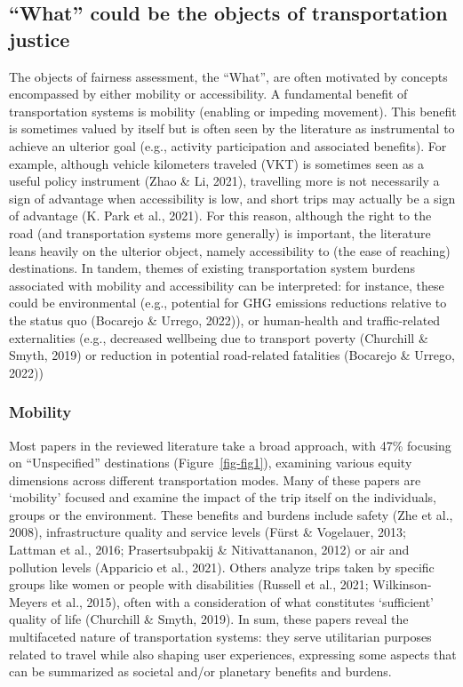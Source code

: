 \documentclass[
  letterpaper,
  DIV=11,
  numbers=noendperiod]{scrartcl}
\begin{document}
\subsection{``What'' could be the objects of transportation
justice}\label{what-could-be-the-objects-of-transportation-justice}

The objects of fairness assessment, the ``What'', are often motivated by
concepts encompassed by either mobility or accessibility. A fundamental
benefit of transportation systems is mobility (enabling or impeding
movement). This benefit is sometimes valued by itself but is often seen
by the literature as instrumental to achieve an ulterior goal (e.g.,
activity participation and associated benefits). For example, although
vehicle kilometers traveled (VKT) is sometimes seen as a useful policy
instrument (Zhao \& Li, 2021), travelling more is not necessarily a sign
of advantage when accessibility is low, and short trips may actually be
a sign of advantage (K. Park et al., 2021). For this reason, although
the right to the road (and transportation systems more generally) is
important, the literature leans heavily on the ulterior object, namely
accessibility to (the ease of reaching) destinations. In tandem, themes
of existing transportation system burdens associated with mobility and
accessibility can be interpreted: for instance, these could be
environmental (e.g., potential for GHG emissions reductions relative to
the status quo (Bocarejo \& Urrego, 2022)), or human-health and
traffic-related externalities (e.g., decreased wellbeing due to
transport poverty (Churchill \& Smyth, 2019) or reduction in potential
road-related fatalities (Bocarejo \& Urrego, 2022))

\subsubsection{Mobility}\label{mobility}

Most papers in the reviewed literature take a broad approach, with 47\%
focusing on ``Unspecified'' destinations (Figure~\ref{fig-fig1}),
examining various equity dimensions across different transportation
modes. Many of these papers are `mobility' focused and examine the
impact of the trip itself on the individuals, groups or the environment.
These benefits and burdens include safety (Zhe et al., 2008),
infrastructure quality and service levels (Fürst \& Vogelauer, 2013;
Lattman et al., 2016; Prasertsubpakij \& Nitivattananon, 2012) or air
and pollution levels (Apparicio et al., 2021). Others analyze trips
taken by specific groups like women or people with disabilities (Russell
et al., 2021; Wilkinson-Meyers et al., 2015), often with a consideration
of what constitutes `sufficient' quality of life (Churchill \& Smyth,
2019). In sum, these papers reveal the multifaceted nature of
transportation systems: they serve utilitarian purposes related to
travel while also shaping user experiences, expressing some aspects that
can be summarized as societal and/or planetary benefits and burdens.
\end{document}
